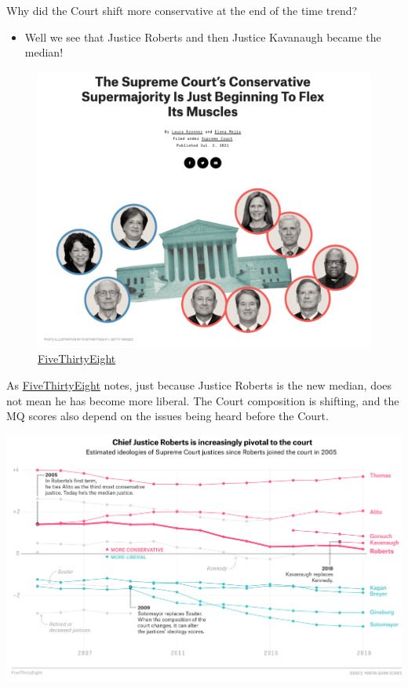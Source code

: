 \documentclass[
  letterpaper,
  DIV=11,
  numbers=noendperiod]{scrreprt}
\providecommand{\tightlist}{%
  \setlength{\itemsep}{0pt}\setlength{\parskip}{0pt}}\usepackage{longtable,booktabs,array}
\begin{document}
Why did the Court shift more conservative at the end of the time trend?

\begin{itemize}
\tightlist
\item
  Well we see that Justice Roberts and then Justice Kavanaugh became the
  median!
\end{itemize}

\begin{figure}

{\centering \includegraphics{images/sccourt3.png}

}

\caption{\href{https://fivethirtyeight.com/features/the-supreme-courts-conservative-supermajority-is-just-beginning-to-flex-its-muscles}{FiveThirtyEight}}

\end{figure}

As
\href{https://fivethirtyeight.com/features/roberts-is-the-new-swing-justice-that-doesnt-mean-hes-becoming-more-liberal/}{FiveThirtyEight}
notes, just because Justice Roberts is the new median, does not mean he
has become more liberal. The Court composition is shifting, and the MQ
scores also depend on the issues being heard before the Court.

\includegraphics{images/sccourt.png}
\end{document}
